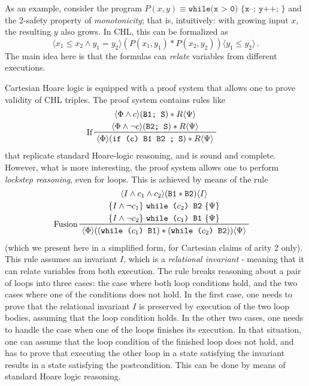 As an example, consider the program $P(x,y) \equiv \texttt{while(x > 0) \{ x--; y++; \} }$ and the 2-safety property
of \emph{monotonicity}; that is, intuitively: with growing input $x$, the resulting $y$ also grows.
In CHL, this can be formalized as
\begin{equation*}
\langle x_1 \leq x_2 \land y_1 = y_2  \rangle (P(x_1, y_1) * P(x_2, y_2)) \langle y_1 \leq y_2 \rangle \, .
\end{equation*}
The main idea here is that the formulas can \emph{relate} variables from different executions.

Cartesian Hoare logic is equipped with a proof system that allows one to prove validity of CHL triples.
The proof system contains rules like
\begin{align}\label{chlRule:If}
    & \prftree[l]{If}
      { \prfStackPremises
        { \langle \Phi \land c \rangle (\texttt{B1; S}) * R \langle \Psi \rangle }
        { \langle \Phi \land \neg c \rangle (\texttt{B2; S}) * R \langle \Psi \rangle }
      }
      { \langle \Phi \rangle (\texttt{if (c) {B1} {B2} ; S}) * R \langle \Psi \rangle }
\end{align}
that replicate standard Hoare-logic reasoning, and is sound and complete.
However, what is more interesting, the proof system allows one to perform \emph{lockstep reasoning},
even for loops. This is achieved by means of the rule
\begin{align*}
  & \prftree[l]{Fusion}
    { \prfStackPremises
    { \langle I \land c_1 \land c_2 \rangle (\texttt{B1} * \texttt{B2}) \langle I \rangle }
    { \{ I \land \neg c_1 \}\ \texttt{while (}c_2\texttt{) {B2}}\ \{ \Psi \} }
    { \{ I \land \neg c_2 \}\ \texttt{while (}c_1\texttt{) {B1}}\ \{ \Psi \} }
  }
  { \langle \Phi \rangle ((\texttt{while (}c_1\texttt{) {B1}}) * (\texttt{while (}c_2\texttt{) {B2}}))  \langle \Psi \rangle }
\end{align*}
(which we present here in a simplified form, for Cartesian claims of arity 2 only).
This rule assumes an invariant $I$, which is a \emph{relational invariant} - meaning that it can relate variables
from both execution.
The rule breaks reasoning about a pair of loops into three cases: the case where both loop conditions hold,
and the two cases where one of the conditions does not hold.
In the first case, one needs to prove that the relational invariant $I$ is preserved by execution of the two loop bodies,
assuming that the loop condition holds.
In the other two cases, one needs to handle the case when one of the loops finishes its execution.
In that situation, one can assume that the loop condition of the finished loop does not hold,
and has to prove that executing the other loop in a state satisfying the invariant results in a state
satisfying the postcondition. This can be done by means of standard Hoare logic reasoning.

